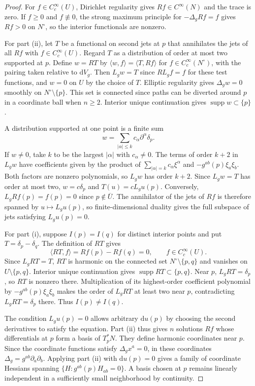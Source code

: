 \documentclass[11pt,a4paper]{article}
\theoremstyle{definition}
\theoremstyle{remark}
\newcommand{\dd}{\mathrm d}
\DeclareMathOperator{\supp}{supp}
\numberwithin{equation}{section}
\begin{document}
\begin{proof}
For $f\in C_c^\infty(U)$, Dirichlet regularity gives
$Rf\in C^\infty(N)$ and the trace is zero. If $f\ge0$ and
$f\not\equiv0$, the strong maximum principle for $-\Delta_g Rf=f$
gives $Rf>0$ on $N^\circ$, so the interior functionals are nonzero.

For part (ii), let $T$ be a functional on second jets at $p$ that
annihilates the jets of all $Rf$ with $f\in C_c^\infty(U)$. Regard
$T$ as a distribution of order at most two supported at $p$.
Define $w=RT$ by $\langle w,f\rangle=\langle T,Rf\rangle$ for
$f\in C_c^\infty(N^\circ)$, with the pairing taken relative to
$\dd V_g$. Then $L_gw=T$ since $RL_gf=f$ for these test functions,
and $w=0$ on $U$ by the choice of $T$. Elliptic regularity gives
$\Delta_gw=0$ smoothly on $N^\circ\setminus\{p\}$. This set is
connected since paths can be diverted around $p$ in a coordinate
ball when $n\ge2$. Interior unique continuation
\citep[Theorem~8]{KochTataru2005} gives $\supp w\subset\{p\}$.

A distribution supported at one point is a finite sum
\[
 w=\sum_{|\alpha|\le k}c_\alpha\partial^\alpha\delta_p.
\]
If $w\ne0$, take $k$ to be the largest $|\alpha|$ with
$c_\alpha\ne0$. The terms of order $k+2$ in $L_gw$ have coefficients
given by the product of $\sum_{|\alpha|=k}c_\alpha\xi^\alpha$ and
$-g^{ab}(p)\xi_a\xi_b$. Both factors are nonzero polynomials, so
$L_gw$ has order $k+2$. Since $L_gw=T$ has order at most two,
$w=c\delta_p$ and $T(u)=cL_gu(p)$. Conversely, $L_gRf(p)=f(p)=0$
since $p\notin\overline U$. The annihilator of the jets of $Rf$
is therefore spanned by $u\mapsto L_gu(p)$, so finite-dimensional
duality gives the full subspace of jets satisfying $L_gu(p)=0$.

For part (i), suppose $I(p)=I(q)$ for distinct interior points and
put $T=\delta_p-\delta_q$. The definition of $RT$ gives
\[
 \langle RT,f\rangle=Rf(p)-Rf(q)=0,
 \qquad f\in C_c^\infty(U).
\]
Since $L_gRT=T$, $RT$ is harmonic on the connected set
$N^\circ\setminus\{p,q\}$ and vanishes on $U\setminus\{p,q\}$.
Interior unique continuation \citep[Theorem~8]{KochTataru2005}
gives $\supp RT\subset\{p,q\}$. Near $p$, $L_gRT=\delta_p$, so
$RT$ is nonzero there. Multiplication of its highest-order
coefficient polynomial by $-g^{ab}(p)\xi_a\xi_b$ makes the order of
$L_gRT$ at least two near $p$, contradicting $L_gRT=\delta_p$ there.
Thus $I(p)\ne I(q)$.

The condition $L_g u(p)=0$ allows arbitrary $\dd u(p)$ by
choosing the second derivatives to satisfy the equation. Part (ii)
thus gives $n$ solutions $Rf$ whose differentials at $p$ form a
basis of $T_p^*N$. They define harmonic coordinates near $p$.
Since the coordinate functions satisfy $\Delta_g x^a=0$, in these
coordinates $\Delta_g=g^{ab}\partial_a\partial_b$. Applying part (ii)
with $\dd u(p)=0$ gives a family of coordinate Hessians spanning
$\{H:g^{ab}(p)H_{ab}=0\}$. A basis chosen at $p$ remains linearly
independent in a sufficiently small neighborhood by continuity.
\end{proof}
\end{document}
